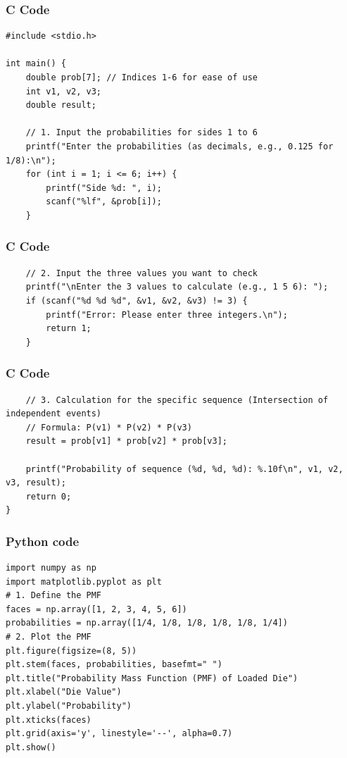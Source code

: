 \documentclass{beamer}
\begin{document}
\begin{frame}[fragile]
\frametitle{C Code}
\begin{lstlisting}
#include <stdio.h>

int main() {
    double prob[7]; // Indices 1-6 for ease of use
    int v1, v2, v3;
    double result;

    // 1. Input the probabilities for sides 1 to 6
    printf("Enter the probabilities (as decimals, e.g., 0.125 for 1/8):\n");
    for (int i = 1; i <= 6; i++) {
        printf("Side %d: ", i);
        scanf("%lf", &prob[i]);
    }
\end{lstlisting}
\end{frame}

\begin{frame}[fragile]
\frametitle{C Code}
\begin{lstlisting}
    // 2. Input the three values you want to check
    printf("\nEnter the 3 values to calculate (e.g., 1 5 6): ");
    if (scanf("%d %d %d", &v1, &v2, &v3) != 3) {
        printf("Error: Please enter three integers.\n");
        return 1;
    }

\end{lstlisting}
\end{frame}

\begin{frame}[fragile]
\frametitle{C Code}
\begin{lstlisting}
    // 3. Calculation for the specific sequence (Intersection of independent events)
    // Formula: P(v1) * P(v2) * P(v3)
    result = prob[v1] * prob[v2] * prob[v3];

    printf("Probability of sequence (%d, %d, %d): %.10f\n", v1, v2, v3, result);
    return 0;
}
\end{lstlisting}
\end{frame}

\begin{frame}[fragile]
\frametitle{Python code}
\begin{lstlisting}
import numpy as np
import matplotlib.pyplot as plt
# 1. Define the PMF
faces = np.array([1, 2, 3, 4, 5, 6])
probabilities = np.array([1/4, 1/8, 1/8, 1/8, 1/8, 1/4])
# 2. Plot the PMF
plt.figure(figsize=(8, 5))
plt.stem(faces, probabilities, basefmt=" ")
plt.title("Probability Mass Function (PMF) of Loaded Die")
plt.xlabel("Die Value")
plt.ylabel("Probability")
plt.xticks(faces)
plt.grid(axis='y', linestyle='--', alpha=0.7)
plt.show() 
\end{lstlisting}   
\end{frame}
\end{document}
